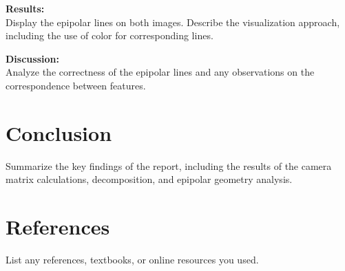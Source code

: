 \documentclass{article}
\begin{document}
\textbf{Results:} \\
Display the epipolar lines on both images. Describe the visualization approach, including the use of color for corresponding lines.

\textbf{Discussion:} \\
Analyze the correctness of the epipolar lines and any observations on the correspondence between features.

\section{Conclusion}
Summarize the key findings of the report, including the results of the camera matrix calculations, decomposition, and epipolar geometry analysis.

\section{References}
List any references, textbooks, or online resources you used.
\end{document}
